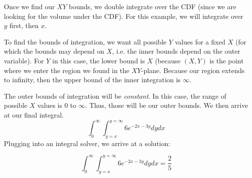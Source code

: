 \documentclass[titlepage, 12pt, leqno]{article}
\begin{document}
Once we find our $XY$ bounds, we double integrate over the CDF (since we are 
looking for the volume under the CDF). For this example, we will integrate over
$y$ first, then $x$. 

To find the bounds of integration, we want all possible $Y$ values for a fixed $X$
(for which the bounds may depend on $X$, i.e. the inner bounds depend on the
outer variable). For $Y$ in this case, the lower bound is $X$ (because $(X,Y)$ is
the point where we enter the region we found in the $XY$-plane. Because our
region extends to infinity, then the upper bound of the inner integration is
$\infty$.

The outer bounds of integration will be \textit{constant}. In this case, the
range of possible $X$ values is 0 to $\infty$. Thus, those will be our outer 
bounds. We then arrive at our final integral.
\[
    \int_{0}^{\infty}\int_{y=x}^{y=\infty}6e^{-2x-3y}dydx
\]
Plugging into an integral solver, we arrive at a solution:

\[
    \boxed{\int_{0}^{\infty}\int_{y=x}^{y=\infty}6e^{-2x-3y}dydx =
    \frac{2}{5}}
\]
\pagebreak
{}
\end{document}
